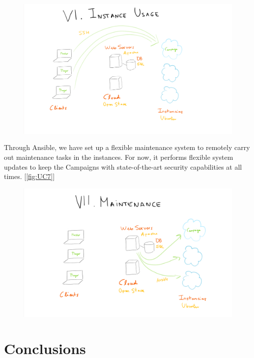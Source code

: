 \documentclass[a4paper,12pt]{report}
\begin{document}
\begin{figure}[h!]
\caption{}
\centering
\includegraphics[width=1\textwidth]{images/Phase6.png}
\label{fig:UC6}
\end{figure}


Through Ansible, we have set up a flexible maintenance system to remotely carry out maintenance tasks in the instances. For now, it performs flexible system updates to keep the Campaigns with state-of-the-art security capabilities at all times. [\autoref{fig:UC7}]

\begin{figure}[h!]
\caption{}
\centering
\includegraphics[width=1\textwidth]{images/Phase7.png}
\label{fig:UC7}
\end{figure}



\chapter{Conclusions}
\label{ch:Conclusions}
\end{document}

